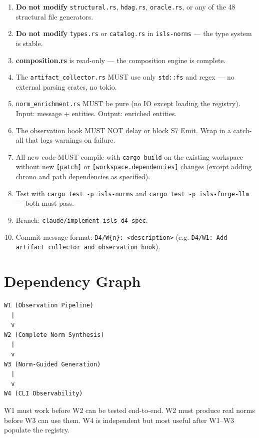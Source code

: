 \documentclass[11pt,a4paper]{article}
\begin{document}
\begin{enumerate}
\item \textbf{Do not modify} \texttt{structural.rs}, \texttt{hdag.rs}, 
      \texttt{oracle.rs}, or any of the 48 structural file generators.
\item \textbf{Do not modify} \texttt{types.rs} or \texttt{catalog.rs} 
      in \texttt{isls-norms} --- the type system is stable.
\item \textbf{composition.rs} is read-only --- the composition engine 
      is complete.
\item The \texttt{artifact\_collector.rs} MUST use only \texttt{std::fs} 
      and regex --- no external parsing crates, no tokio.
\item \texttt{norm\_enrichment.rs} MUST be pure (no IO except loading 
      the registry). Input: message + entities. Output: enriched entities.
\item The observation hook MUST NOT delay or block S7 Emit. Wrap in 
      a catch-all that logs warnings on failure.
\item All new code MUST compile with \texttt{cargo build} on the 
      existing workspace without new \texttt{[patch]} or 
      \texttt{[workspace.dependencies]} changes (except adding 
      chrono and path dependencies as specified).
\item Test with \texttt{cargo test -p isls-norms} and 
      \texttt{cargo test -p isls-forge-llm} --- both must pass.
\item Branch: \texttt{claude/implement-isls-d4-spec}.
\item Commit message format: \texttt{D4/W\{n\}: <description>} 
      (e.g. \texttt{D4/W1: Add artifact collector and observation hook}).
\end{enumerate}


\section{Dependency Graph}

\begin{verbatim}
W1 (Observation Pipeline)
  |
  v
W2 (Complete Norm Synthesis)
  |
  v
W3 (Norm-Guided Generation)
  |
  v
W4 (CLI Observability)
\end{verbatim}

W1 must work before W2 can be tested end-to-end. W2 must produce 
real norms before W3 can use them. W4 is independent but most useful 
after W1--W3 populate the registry.
\end{document}
